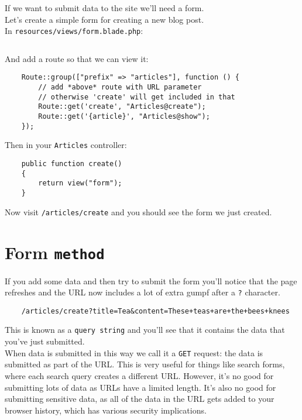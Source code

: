 If we want to submit data to the site we'll need a form.
\\

Let's create a simple form for creating a new blog post.
\\

In \texttt{resources/views/form.blade.php}:

\inputminted{php}{09-forms/figures/01-form.blade.php}

And add a route so that we can view it:

\begin{verbatim}
    Route::group(["prefix" => "articles"], function () {
        // add *above* route with URL parameter
        // otherwise 'create' will get included in that
        Route::get('create', "Articles@create");
        Route::get('{article}', "Articles@show");
    });
\end{verbatim}

Then in your \texttt{Articles} controller:

\begin{verbatim}
    public function create()
    {
        return view("form");
    }
\end{verbatim}

Now visit \texttt{/articles/create} and you should see the form we just created.

\section{Form \texttt{method}}

If you add some data and then try to submit the form you'll notice that the page refreshes and the URL now includes a lot of extra gumpf after a \texttt{?} character.

\begin{verbatim}
    /articles/create?title=Tea&content=These+teas+are+the+bees+knees
\end{verbatim}

This is known as a \texttt{query string} and you'll see that it contains the data that you've just submitted.
\\

When data is submitted in this way we call it a \texttt{GET} request: the data is submitted as part of the URL. This is very useful for things like search forms, where each search query creates a different URL. However, it's no good for submitting lots of data as URLs have a limited length. It's also no good for submitting sensitive data, as all of the data in the URL gets added to your browser history, which has various security implications.
\\

